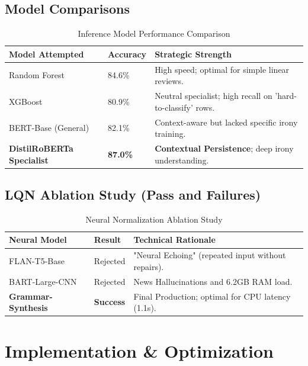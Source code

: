 \documentclass[11pt,oneside]{scrbook}
\begin{document}
\section{Model Comparisons}
\begin{table}[h]
\centering
\begin{tabular}{p{4.5cm}p{2.5cm}p{8cm}}
\toprule
\textbf{Model Attempted} & \textbf{Accuracy} & \textbf{Strategic Strength} \\
\midrule
Random Forest & 84.6\% & High speed; optimal for simple linear reviews. \\
XGBoost & 80.9\% & Neutral specialist; high recall on 'hard-to-classify' rows. \\
BERT-Base (General) & 82.1\% & Context-aware but lacked specific irony training. \\
\textbf{DistilRoBERTa Specialist} & \textbf{87.0\%} & \textbf{Contextual Persistence}; deep irony understanding. \\
\bottomrule
\end{tabular}
\caption{Inference Model Performance Comparison}
\end{table}

\section{LQN Ablation Study (Pass and Failures)}
\begin{table}[h]
\centering
\begin{tabular}{p{4cm}p{3cm}p{8cm}}
\toprule
\textbf{Neural Model} & \textbf{Result} & \textbf{Technical Rationale} \\
\midrule
FLAN-T5-Base & Rejected & "Neural Echoing" (repeated input without repairs). \\
BART-Large-CNN & Rejected & News Hallucinations and 6.2GB RAM load. \\
\textbf{Grammar-Synthesis} & \textbf{Success} & Final Production; optimal for CPU latency (1.1s). \\
\bottomrule
\end{tabular}
\caption{Neural Normalization Ablation Study}
\end{table}

\chapter{Implementation \& Optimization}
\end{document}
